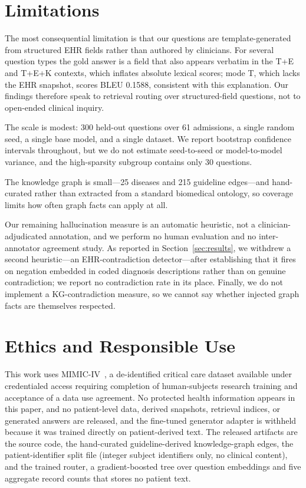\documentclass[conference]{IEEEtran}
\begin{document}
\section{Limitations}
\label{sec:limitations}

The most consequential limitation is that our questions are
template-generated from structured EHR fields rather than authored by
clinicians. For several question types the gold answer is a field that
also appears verbatim in the T+E and T+E+K contexts, which inflates
absolute lexical scores; mode T, which lacks the EHR snapshot, scores
BLEU 0.1588, consistent with this explanation. Our findings therefore
speak to retrieval routing over structured-field questions, not to
open-ended clinical inquiry.

The scale is modest: 300 held-out questions over 61 admissions, a
single random seed, a single base model, and a single dataset. We
report bootstrap confidence intervals throughout, but we do not
estimate seed-to-seed or model-to-model variance, and the
high-sparsity subgroup contains only 30 questions.

The knowledge graph is small---25 diseases and 215 guideline
edges---and hand-curated rather than extracted from a standard
biomedical ontology, so coverage limits how often graph facts can
apply at all.

Our remaining hallucination measure is an automatic heuristic, not a
clinician-adjudicated annotation, and we perform no human evaluation
and no inter-annotator agreement study. As reported in
Section~\ref{sec:results}, we withdrew a second heuristic---an
EHR-contradiction detector---after establishing that it fires on
negation embedded in coded diagnosis descriptions rather than on
genuine contradiction; we report no contradiction rate in its place.
Finally, we do not implement a KG-contradiction measure, so we cannot
say whether injected graph facts are themselves respected.

\section{Ethics and Responsible Use}

This work uses MIMIC-IV~\cite{mimiciv2023}, a de-identified critical
care dataset available under credentialed access requiring completion
of human-subjects research training and acceptance of a data use
agreement. No protected health information appears in this paper, and
no patient-level data, derived snapshots, retrieval indices, or
generated answers are released, and the fine-tuned generator adapter is
withheld because it was trained directly on patient-derived text. The
released artifacts are the source code, the hand-curated
guideline-derived knowledge-graph edges, the patient-identifier split
file (integer subject identifiers only, no clinical content), and the
trained router, a gradient-boosted tree over question embeddings and
five aggregate record counts that stores no patient text.
\end{document}
